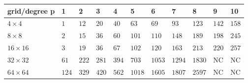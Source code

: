 \begin{tabular}{lllllllllll}
\hline
 grid/degree p   & 1     & 2     & 3     & 4     & 5      & 6      & 7      & 8      & 9     & 10    \\
\hline
 $4 \times 4$    & $1$   & $12$  & $20$  & $40$  & $63$   & $69$   & $93$   & $123$  & $142$ & $158$ \\
 $8 \times 8$    & $2$   & $15$  & $36$  & $60$  & $101$  & $110$  & $148$  & $189$  & $198$ & $245$ \\
 $16 \times 16$  & $3$   & $19$  & $36$  & $67$  & $102$  & $120$  & $163$  & $213$  & $220$ & $257$ \\
 $32 \times 32$  & $61$  & $222$ & $281$ & $394$ & $703$  & $1053$ & $1294$ & $1830$ & NC    & NC    \\
 $64 \times 64$  & $124$ & $329$ & $420$ & $562$ & $1018$ & $1605$ & $1807$ & $2597$ & NC    & NC    \\
\hline
\end{tabular}